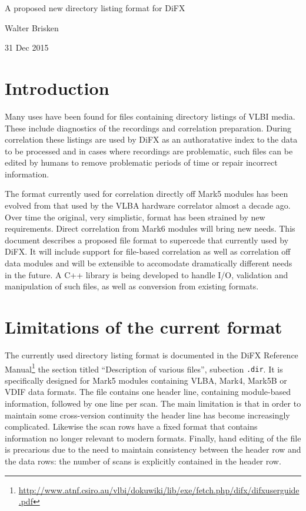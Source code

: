 \documentclass[12pt]{article}
\begin{document}
\begin{center}

\vspace{10pt}
{\Large A proposed new directory listing format for DiFX}

\vspace{15pt}
Walter Brisken

\vspace{5pt}
31 Dec 2015
\end{center}

\section{Introduction}

Many uses have been found for files containing directory listings of VLBI media.
These include diagnostics of the recordings and correlation preparation.
During correlation these listings are used by DiFX as an authoratative index to the data to be processed and in cases where recordings are problematic, such files can be edited by humans to remove problematic periods of time or repair incorrect information.

The format currently used for correlation directly off Mark5 modules has been evolved from that used by the VLBA hardware correlator almost a decade ago.
Over time the original, very simplistic, format has been strained by new requirements.
Direct correlation from Mark6 modules will bring new needs.
This document describes a proposed file format to supercede that currently used by DiFX.
It will include support for file-based correlation as well as correlation off data modules and will be extensible to accomodate dramatically different needs in the future.
A C++ library is being developed to handle I/O, validation and manipulation of such files, as well as conversion from existing formats.

\section{Limitations of the current format}

The currently used directory listing format is documented in the DiFX Reference Manual\footnote{\url{http://www.atnf.csiro.au/vlbi/dokuwiki/lib/exe/fetch.php/difx/difxuserguide.pdf}} the section titled ``Description of various files'', subection {\tt .dir}.
It is specifically designed for Mark5 modules containing VLBA, Mark4, Mark5B or VDIF data formats.
The file contains one header line, containing module-based information, followed by one line per scan.
The main limitation is that in order to maintain some cross-version continuity the header line has become increasingly complicated.
Likewise the scan rows have a fixed format that contains information no longer relevant to modern formats.
Finally, hand editing of the file is precarious due to the need to maintain consistency between the header row and the data rows: the number of scans is explicitly contained in the header row.
\end{document}
